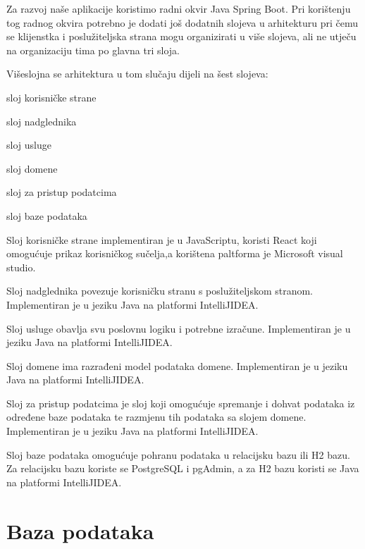 		Za razvoj naše aplikacije koristimo radni okvir Java Spring Boot. Pri korištenju tog radnog okvira potrebno je dodati još dodatnih slojeva u arhitekturu pri čemu se klijenstka i poslužiteljska strana mogu organizirati u više slojeva, ali ne utječu na organizaciju tima po glavna tri sloja.
		
		\vspace{5mm}
		\noindent Višeslojna se arhitektura u tom slučaju dijeli na šest slojeva:
		\begin{packed_enum}
			\item  sloj korisničke strane
		
			\item  sloj nadglednika
	
			\item  sloj usluge
		
			\item  sloj domene
		
			\item  sloj za pristup podatcima
		
			\item  sloj baze podataka
		\end{packed_enum}
		
	Sloj korisničke strane implementiran je u JavaScriptu, koristi React koji omogućuje prikaz korisničkog sučelja,a korištena paltforma je Microsoft visual studio.
	
	Sloj nadglednika povezuje korisničku stranu s poslužiteljskom stranom. Implementiran je u jeziku Java na platformi IntelliJIDEA.
	
	Sloj usluge obavlja svu poslovnu logiku i potrebne izračune. Implementiran je u jeziku Java na platformi IntelliJIDEA.
	
	Sloj domene ima razrađeni model podataka domene. Implementiran je u jeziku Java na platformi IntelliJIDEA.
	
	Sloj za pristup podatcima je sloj koji omogućuje spremanje i dohvat podataka iz određene baze podataka te razmjenu tih podataka sa slojem domene. Implementiran je u jeziku Java na platformi IntelliJIDEA.
	
	 Sloj baze podataka omogućuje pohranu podataka u relacijsku bazu ili H2 bazu. Za relacijsku bazu koriste se PostgreSQL i pgAdmin, a za H2 bazu koristi se Java na platformi IntelliJIDEA.
	
		

		

				
		\section{Baza podataka}
			
